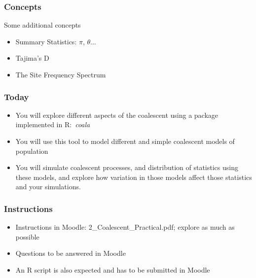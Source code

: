 \documentclass[8pt]{beamer}
\begin{document}
\begin{frame}
    \frametitle{Concepts}

    \large

    Some additional concepts

    \vspace{1em}

    \begin{itemize}
    
        \item<1-> Summary Statistics: $\pi$, $\theta$...

        \item<2-> Tajima's D

        \item<3-> The Site Frequency Spectrum

    \end{itemize}

\end{frame}

\begin{frame}

    \frametitle{Today}
    \large

    \begin{itemize}
    
        \item<1-> You will explore different aspects of the coalescent
            using a package implemented in R:\ \textit{coala}

        \item<2-> You will use this tool to model different and simple
            coalescent models of population

        \item<3-> You will simulate coalescent processes, and distribution of
            statistics using these models, and explore how variation in
            those models affect those statistics and your simulations.

    \end{itemize}

\end{frame}

\begin{frame}
    \frametitle{Instructions}

    \begin{itemize}
    
    \item<1-> Instructions in Moodle: 2\_Coalescent\_Practical.pdf;
    explore as much as possible
    \vspace{1em}

    \item<2-> Questions to be answered in Moodle
    \vspace{1em}

    \item<3-> An R script is also expected and has to be submitted
    in Moodle

    \end{itemize}

\end{frame}
\end{document}
